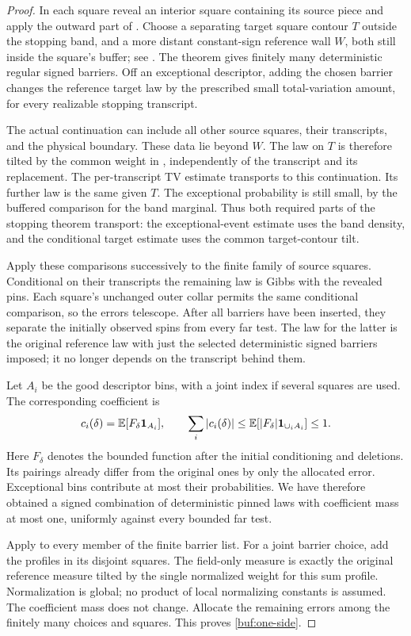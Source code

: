 \begin{proof}
In each square reveal an interior square containing its source piece
and apply the outward part of .  Choose a separating
target square contour $T$ outside the stopping band, and a more
distant constant-sign reference wall $W$, both still inside the
square's buffer; see .  The theorem gives finitely
many deterministic regular signed barriers.  Off an exceptional
descriptor, adding the chosen barrier changes the reference target
law by the prescribed small total-variation amount, for every
realizable stopping transcript.

The actual continuation can include all other source squares, their
transcripts, and the physical boundary.  These data lie beyond $W$.
The law on $T$ is therefore tilted by the common weight in
, independently of the transcript and its replacement.
The per-transcript TV estimate transports to this continuation.
Its further law is the same given $T$.  The exceptional probability
is still small, by the buffered comparison for the band marginal.
Thus both required parts of the stopping theorem transport: the
exceptional-event estimate uses the band density, and the conditional
target estimate uses the common target-contour tilt.

Apply these comparisons successively to the finite family of source
squares.  Conditional on their transcripts the remaining law is
Gibbs with the revealed pins.  Each square's unchanged outer collar
permits the same conditional comparison, so the errors telescope.
After all barriers have been inserted, they separate the initially
observed spins from every far test.  The law for the latter is the
original reference law with just the selected deterministic signed
barriers imposed; it no longer depends on the transcript behind them.

Let $A_i$ be the good descriptor bins, with a joint index if several
squares are used.  The corresponding coefficient is
\[
 c_i(\delta)=\mathbb E[F_\delta\mathbf 1_{A_i}],
 \qquad
 \sum_i|c_i(\delta)|
 \le\mathbb E[|F_\delta|\mathbf 1_{\cup_i A_i}]\le1.
\]
Here $F_\delta$ denotes the bounded function after the initial
conditioning and deletions.  Its pairings already differ from the
original ones by only the allocated error.  Exceptional bins
contribute at most their probabilities.  We have therefore obtained
a signed combination of deterministic pinned laws with coefficient
mass at most one, uniformly against every bounded far test.

Apply  to every member of the finite barrier list.
For a joint barrier choice, add the profiles in its disjoint squares.
The field-only measure is exactly the original reference measure
tilted by the single normalized weight for this sum profile.
Normalization is global; no product of local normalizing constants
is assumed.  The coefficient mass does not change.  Allocate the
remaining errors among the finitely many choices and squares.
This proves \eqref{buf:one-side}.


\end{proof}
